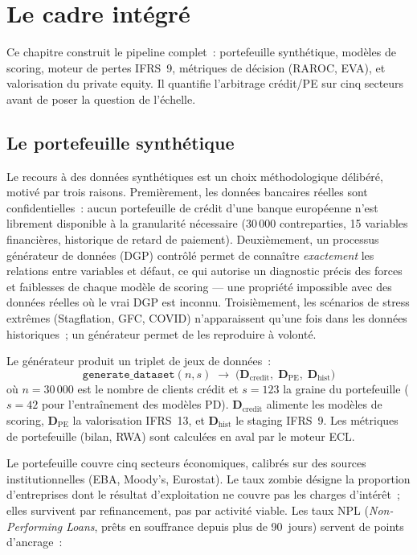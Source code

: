 \documentclass[10pt, a4paper, oneside]{report}
\theoremstyle{definition}
\begin{document}
\chapter{Le cadre intégré}
\label{chap:cadre}

Ce chapitre construit le pipeline complet~: portefeuille synthétique, modèles de scoring, moteur de pertes IFRS~9, métriques de décision (RAROC, EVA), et valorisation du private equity. Il quantifie l'arbitrage crédit/PE sur cinq secteurs avant de poser la question de l'échelle.


\section{Le portefeuille synthétique}
\label{sec:ch1:dgp}

Le recours à des données synthétiques est un choix méthodologique délibéré, motivé par trois raisons. Premièrement, les données bancaires réelles sont confidentielles~: aucun portefeuille de crédit d'une banque européenne n'est librement disponible à la granularité nécessaire (30\,000 contreparties, 15 variables financières, historique de retard de paiement). Deuxièmement, un processus générateur de données (DGP) contrôlé permet de connaître \emph{exactement} les relations entre variables et défaut, ce qui autorise un diagnostic précis des forces et faiblesses de chaque modèle de scoring --- une propriété impossible avec des données réelles où le vrai DGP est inconnu. Troisièmement, les scénarios de stress extrêmes (Stagflation, GFC, COVID) n'apparaissent qu'une fois dans les données historiques~; un générateur permet de les reproduire à volonté.

Le générateur produit un triplet de jeux de données~:
%
\begin{equation}
\texttt{generate\_dataset}(n, s) \;\to\; \bigl(\mathbf{D}_{\text{credit}},\; \mathbf{D}_{\text{PE}},\; \mathbf{D}_{\text{hist}}\bigr)
\label{eq:generate_dataset}
\end{equation}
%
où $n = 30\,000$ est le nombre de clients crédit et $s = 123$ la graine du portefeuille ($s = 42$ pour l'entraînement des modèles PD). $\mathbf{D}_{\text{credit}}$ alimente les modèles de scoring, $\mathbf{D}_{\text{PE}}$ la valorisation IFRS~13, et $\mathbf{D}_{\text{hist}}$ le staging IFRS~9. Les métriques de portefeuille (bilan, RWA) sont calculées en aval par le moteur ECL.

Le portefeuille couvre cinq secteurs économiques, calibrés sur des sources institutionnelles (EBA, Moody's, Eurostat). Le taux zombie désigne la proportion d'entreprises dont le résultat d'exploitation ne couvre pas les charges d'intérêt~; elles survivent par refinancement, pas par activité viable. Les taux NPL (\emph{Non-Performing Loans}, prêts en souffrance depuis plus de 90~jours) servent de points d'ancrage~:
\end{document}
